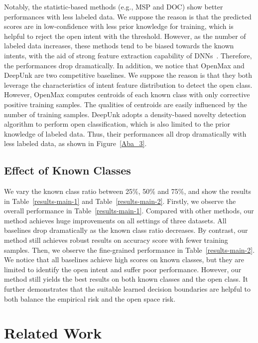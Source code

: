 \documentclass[letterpaper]{article} %
\begin{document}
Notably, the statistic-based methods (e.g., MSP and DOC) show better performances with less labeled data. We suppose the reason is that the predicted scores are in low-confidence with less prior knowledge for training, which is helpful to reject the open intent with the threshold. However, as the number of labeled data increases, these methods tend to be biased towards the known intents, with the aid of strong feature extraction capability of DNNs~\cite{7298640}. Therefore, the performances drop dramatically.  In addition, we notice that OpenMax and DeepUnk are two competitive baselines. We suppose the reason is that they both leverage the characteristics of intent feature distribution to detect the open class. However, OpenMax computes centroids of each known class with only corrective positive training samples. The qualities of centroids are easily influenced by the number of training samples. DeepUnk adopts a density-based novelty detection algorithm to perform open classification, which is also limited to the prior knowledge of labeled data. Thus, their performances all drop dramatically with less labeled data, as shown in Figure~\ref{Aba_3}.


\subsection{Effect of Known Classes}
We vary the known class ratio between 25\%, 50\% and 75\%, and show the results in Table~\ref{results-main-1} and Table~\ref{results-main-2}. Firstly, we observe the overall performance in Table~\ref{results-main-1}. Compared with other methods, our method achieves huge improvements on all settings of three datasets. All baselines drop dramatically as the known class ratio decreases. By contrast, our method still achieves robust results on accuracy score with fewer training samples.  Then, we observe the fine-grained performance in Table~\ref{results-main-2}. We notice that all baselines achieve high scores on known classes, but they are limited to identify the open intent and suffer poor performance. However, our method still yields the best results on both known classes and the open class. It further demonstrates that the suitable learned decision boundaries are helpful to both balance the empirical risk and the open space risk.

\section{Related Work}
\end{document}
